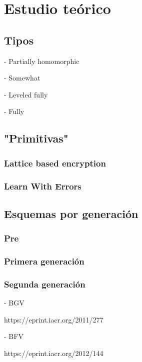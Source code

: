 \chapter{Estudio teórico}

\section{Tipos}

- Partially homomorphic

- Somewhat

- Leveled fully

- Fully

\section{"Primitivas"}

\subsection{Lattice based encryption}

\subsection{Learn With Errors}

\section{Esquemas por generación}

\subsection{Pre}



\subsection{Primera generación}



\subsection{Segunda generación}

- BGV

https://eprint.iacr.org/2011/277

- BFV

https://eprint.iacr.org/2012/144

